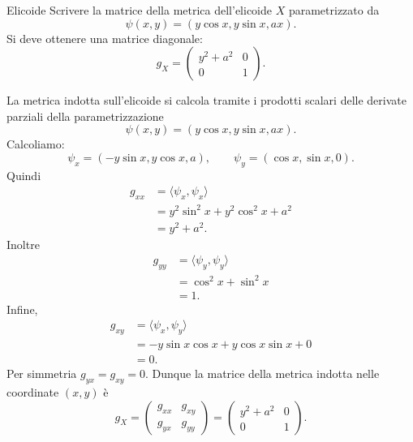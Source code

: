\documentclass[a4paper]{article}
\begin{document}
\begin{snippetexercise}{Elicoide}
    Scrivere la matrice della metrica dell'elicoide \(X\) parametrizzato da
    \[
        \psi(x,y)=
        \left(
            y\cos x,
            y\sin x,
            ax
        \right).
    \]
    Si deve ottenere una matrice diagonale:
    \[
        g_X
        =
        \begin{pmatrix}
            y^2+a^2 & 0\\
            0 & 1
        \end{pmatrix}.
    \]
\end{snippetexercise}

\begin{snippetsolution}{}
    La metrica indotta sull'elicoide si calcola tramite i prodotti scalari delle derivate parziali della parametrizzazione
    \[
        \psi(x,y)=
        \left(
            y\cos x,
            y\sin x,
            ax
        \right).
    \]
    Calcoliamo:
    \[
        \psi_x
        =
        \left(
            -y\sin x,
            y\cos x,
            a
        \right),
        \qquad
        \psi_y
        =
        \left(
            \cos x,
            \sin x,
            0
        \right).
    \]
    Quindi
    \begin{align*}
        g_{xx}
        &=
        \langle \psi_x,\psi_x\rangle\\
        &=
        y^2\sin^2x+y^2\cos^2x+a^2\\
        &=
        y^2+a^2.
    \end{align*}
    Inoltre
    \begin{align*}
        g_{yy}
        &=
        \langle \psi_y,\psi_y\rangle\\
        &=
        \cos^2x+\sin^2x\\
        &=
        1.
    \end{align*}
    Infine,
    \begin{align*}
        g_{xy}
        &=
        \langle \psi_x,\psi_y\rangle\\
        &=
        -y\sin x\cos x+y\cos x\sin x+0\\
        &=
        0.
    \end{align*}
    Per simmetria \(g_{yx}=g_{xy}=0\). Dunque la matrice della metrica indotta nelle coordinate \((x,y)\) è
    \[
        g_X
        =
        \begin{pmatrix}
            g_{xx} & g_{xy}\\
            g_{yx} & g_{yy}
        \end{pmatrix}
        =
        \begin{pmatrix}
            y^2+a^2 & 0\\
            0 & 1
        \end{pmatrix}.
    \]
\end{snippetsolution}
\end{document}
